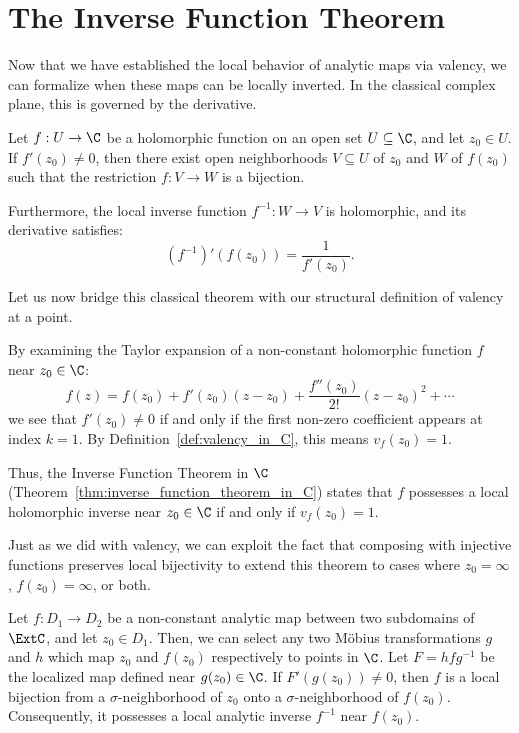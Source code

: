 \section{The Inverse Function Theorem}

Now that we have established the local behavior of analytic maps via valency, we
can formalize when these maps can be locally inverted. In the classical complex
plane, this is governed by the derivative.

\begin{theorem}
    \label{thm:inverse_function_theorem_in_C}
    Let $f: U \to \C$ be a holomorphic function on an open set $U \subseteq \C$,
    and let $z_0 \in U$. If $f'(z_0) \neq 0$, then there exist open
    neighborhoods $V \subseteq U$ of $z_0$ and $W$ of $f(z_0)$ such that the
    restriction $f: V \to W$ is a bijection.
    
    Furthermore, the local inverse function $f^{-1}: W \to V$ is holomorphic,
    and its derivative satisfies:
    \[
        (f^{-1})'(f(z_0)) = \frac{1}{f'(z_0)}.
    \]
\end{theorem}

Let us now bridge this classical theorem with our structural definition of
valency at a point.

\begin{remark}
    By examining the Taylor expansion of a non-constant holomorphic function $f$
    near $z_0 \in \C$:
    \[
        f(z) = f(z_0) + f'(z_0)(z-z_0) + \frac{f''(z_0)}{2!}(z-z_0)^2 + \cdots
    \]
    we see that $f'(z_0) \neq 0$ if and only if the first non-zero coefficient
    appears at index $k=1$. By Definition~\ref{def:valency_in_C}, this means
    $v_f(z_0) = 1$.
    
    Thus, the Inverse Function Theorem in $\C$
    (Theorem~\ref{thm:inverse_function_theorem_in_C}) states that $f$ possesses
    a local holomorphic inverse near $z_0 \in \C$ if and only if $v_f(z_0) = 1$.
\end{remark}

Just as we did with valency, we can exploit the fact that composing with
injective functions preserves local bijectivity to extend this theorem to cases
where $z_0 = \infty$, $f(z_0) = \infty$, or both.

\begin{theorem}
    \label{thm:inverse_function_theorem_in_ExtC}
    Let $f : D_1 \to D_2$ be a non-constant analytic map between two subdomains
    of $\ExtC$, and let $z_0 \in D_1$. Then, we can select any two Möbius
    transformations $g$ and $h$ which map $z_0$ and $f(z_0)$ respectively to
    points in $\C$. Let $F = hfg^{-1}$ be the localized map defined near $g(z_0)
    \in \C$. If $F'(g(z_0)) \neq 0$, then $f$ is a local bijection from a
    $\sigma$-neighborhood of $z_0$ onto a $\sigma$-neighborhood of $f(z_0)$.
    Consequently, it possesses a local analytic inverse $f^{-1}$ near $f(z_0)$.
\end{theorem}

